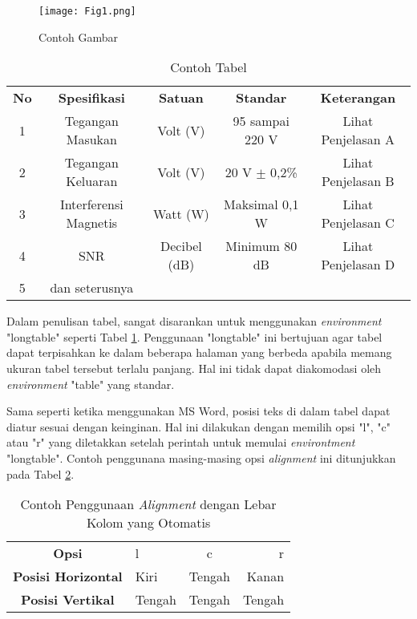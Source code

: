         \begin{figure}[!ht]
            \centering
            \texttt{[image: Fig1.png]}
            \caption{Contoh Gambar}
            \label{fig:example1}
        \end{figure}
    
        \begin{longtable}{|c|c|c|c|c|}
            \caption{Contoh Tabel}
            \label{tab:example1}
            \vspace{-0.75em}\\
            \hline
            \textbf{No} & \textbf{Spesifikasi}  & \textbf{Satuan} & \textbf{Standar} & \textbf{Keterangan} \\ \hline
            1           & Tegangan Masukan      & Volt (V)        & 95 sampai 220 V  & Lihat Penjelasan A  \\ \hline
            2           & Tegangan Keluaran     & Volt (V)        & 20 V $\pm$ 0,2\% & Lihat Penjelasan B  \\ \hline
            3           & Interferensi Magnetis & Watt (W)        & Maksimal 0,1 W   & Lihat Penjelasan C  \\ \hline
            4           & SNR                   & Decibel (dB)    & Minimum 80 dB    & Lihat Penjelasan D  \\ \hline
            5           & dan seterusnya        &                 &                  &                     \\ \hline
        \end{longtable}
        
        Dalam penulisan tabel, sangat disarankan untuk menggunakan \textit{environment} "longtable" seperti Tabel \ref{tab:example1}. Penggunaan "longtable" ini bertujuan agar tabel dapat terpisahkan ke dalam beberapa halaman yang berbeda apabila memang ukuran tabel tersebut terlalu panjang. Hal ini tidak dapat diakomodasi oleh \textit{environment} "table" yang standar.
        
        Sama seperti ketika menggunakan MS Word, posisi teks di dalam tabel dapat diatur sesuai dengan keinginan. Hal ini dilakukan dengan memilih opsi "l", "c" atau "r" yang diletakkan setelah perintah untuk memulai \textit{environtment} "longtable". Contoh penggunana masing-masing opsi \textit{alignment} ini ditunjukkan pada Tabel \ref{tab:alignment_01}.
        
        \begin{longtable}{|c|l|c|r|}
            \caption{Contoh Penggunaan \textit{Alignment} dengan Lebar Kolom yang Otomatis}
            \label{tab:alignment_01}
            \vspace{-0.75em}\\
            \hline
                \textbf{Opsi} & l & c & r    \\
            \hline
                \textbf{Posisi Horizontal} & Kiri & Tengah & Kanan \\
            \hline
                \textbf{Posisi Vertikal} & Tengah & Tengah & Tengah \\
            \hline
        \end{longtable}
        
